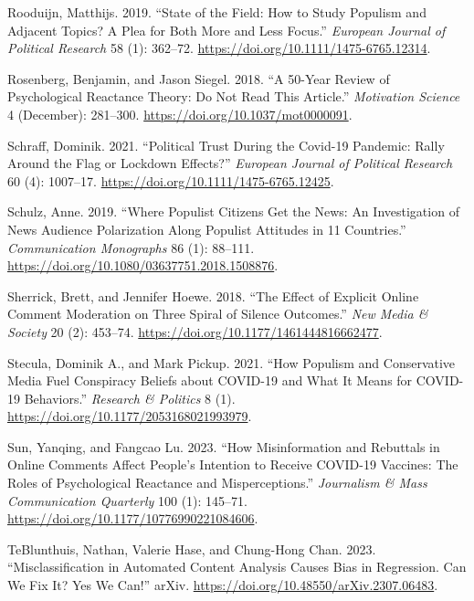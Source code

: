 \documentclass[
]{ccr}
\newlength{\cslhangindent}
\newlength{\cslentryspacingunit} %
\newenvironment{CSLReferences}[2] %
 {%
  \setlength{\parindent}{0pt}
  \ifodd #1
  \let\oldpar\par
  \def\par{\hangindent=\cslhangindent\oldpar}
  \fi
  \setlength{\parskip}{#2\cslentryspacingunit}
 }%
 {}
\begin{document}
\begin{CSLReferences}{1}{0}
\leavevmode{}%
Rooduijn, Matthijs. 2019. {``State of the Field: {How} to Study Populism
and Adjacent Topics? {A} Plea for Both More and Less Focus.''}
\emph{European Journal of Political Research} 58 (1): 362--72.
\url{https://doi.org/10.1111/1475-6765.12314}.

\leavevmode{}%
Rosenberg, Benjamin, and Jason Siegel. 2018. {``A 50-{Year Review} of
{Psychological Reactance Theory}: {Do Not Read This Article}.''}
\emph{Motivation Science} 4 (December): 281--300.
\url{https://doi.org/10.1037/mot0000091}.

\leavevmode{}%
Schraff, Dominik. 2021. {``Political Trust During the {Covid-19}
Pandemic: {Rally} Around the Flag or Lockdown Effects?''} \emph{European
Journal of Political Research} 60 (4): 1007--17.
\url{https://doi.org/10.1111/1475-6765.12425}.

\leavevmode{}%
Schulz, Anne. 2019. {``Where Populist Citizens Get the News: {An}
Investigation of News Audience Polarization Along Populist Attitudes in
11 Countries.''} \emph{Communication Monographs} 86 (1): 88--111.
\url{https://doi.org/10.1080/03637751.2018.1508876}.

\leavevmode{}%
Sherrick, Brett, and Jennifer Hoewe. 2018. {``The Effect of Explicit
Online Comment Moderation on Three Spiral of Silence Outcomes.''}
\emph{New Media \& Society} 20 (2): 453--74.
\url{https://doi.org/10.1177/1461444816662477}.

\leavevmode{}%
Stecula, Dominik A., and Mark Pickup. 2021. {``How Populism and
Conservative Media Fuel Conspiracy Beliefs about {COVID-19} and What It
Means for {COVID-19} Behaviors.''} \emph{Research \& Politics} 8 (1).
\url{https://doi.org/10.1177/2053168021993979}.

\leavevmode{}%
Sun, Yanqing, and Fangcao Lu. 2023. {``How {Misinformation} and
{Rebuttals} in {Online Comments Affect People}'s {Intention} to {Receive
COVID-19 Vaccines}: {The Roles} of {Psychological Reactance} and
{Misperceptions}.''} \emph{Journalism \& Mass Communication Quarterly}
100 (1): 145--71. \url{https://doi.org/10.1177/10776990221084606}.

\leavevmode{}%
TeBlunthuis, Nathan, Valerie Hase, and Chung-Hong Chan. 2023.
{``Misclassification in {Automated Content Analysis Causes Bias} in
{Regression}. {Can We Fix It}? {Yes We Can}!''} {arXiv}.
\url{https://doi.org/10.48550/arXiv.2307.06483}.


\end{CSLReferences}
\end{document}
